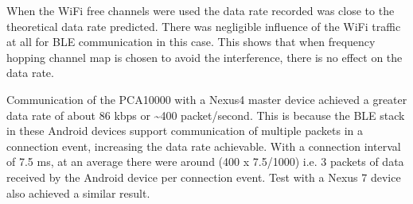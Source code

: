 When the WiFi free channels were used the data rate recorded was close to the theoretical data rate predicted. There was negligible influence of the WiFi traffic at all for BLE communication in this case. This shows that when frequency hopping channel map is chosen to avoid the interference, there is no effect on the data rate.

Communication of the PCA10000 with a Nexus4 master device achieved a greater data rate of about 86 kbps or \textasciitilde400 packet/second. This is because the BLE stack in these Android devices support communication of multiple packets in a connection event, increasing the data rate achievable. With a connection interval of 7.5 ms, at an average there were around (400 x 7.5/1000) i.e. 3 packets of data received by the Android device per connection event. Test with a Nexus 7 device also achieved a similar result.
%
%

